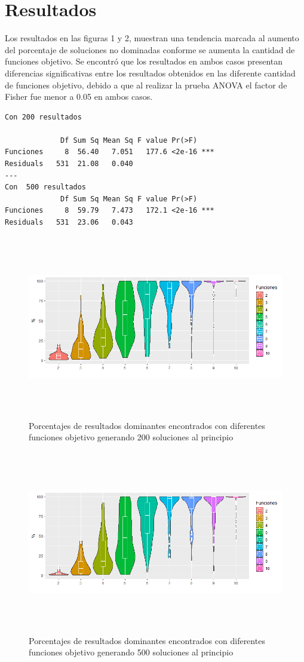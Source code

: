 \documentclass{article}
\begin{document}
\section{Resultados}
Los resultados en las figuras 1 y 2, muestran una tendencia marcada al aumento del porcentaje de soluciones no dominadas conforme se aumenta la cantidad de funciones objetivo.
Se encontró que los resultados en ambos casos presentan diferencias significativas entre los resultados obtenidos en las diferente cantidad de funciones objetivo, debido a que al realizar la prueba ANOVA el factor de Fisher fue menor a 0.05 en ambos casos.
\begin{lstlisting}
Con 200 resultados

             Df Sum Sq Mean Sq F value Pr(>F)    
Funciones     8  56.40   7.051   177.6 <2e-16 ***
Residuals   531  21.08   0.040                   
---
Con  500 resultados
             Df Sum Sq Mean Sq F value Pr(>F)    
Funciones     8  59.79   7.473   172.1 <2e-16 ***
Residuals   531  23.06   0.043 
\end{lstlisting}

\begin{figure}[!ht]
\centering
\includegraphics[width=17cm, height=8cm]{P11graf200.png}
\caption{Porcentajes de resultados dominantes encontrados con diferentes funciones objetivo generando 200 soluciones al principio}
\end{figure}

\begin{figure}[!ht]
\centering
\includegraphics[width=17cm, height=8cm]{P11graf500.png}
\caption{Porcentajes de resultados dominantes encontrados con diferentes funciones objetivo generando 500 soluciones al principio}
\end{figure}
\end{document}
